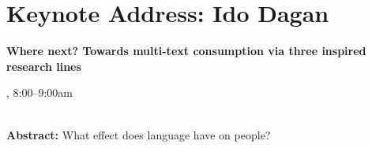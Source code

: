 \section{Keynote Address: Ido Dagan}

\begin{center}
\begin{Large}
{\bfseries\Large Where next? Towards multi-text consumption via three inspired research lines}\vspace{1em}\par
\end{Large}


\daydateyear, 8:00--9:00am \vspace{1em}\\
\PlenaryLoc \\
\vspace{1em}\par
\end{center}

\noindent
{\bfseries Abstract:} What effect does language have on people?

